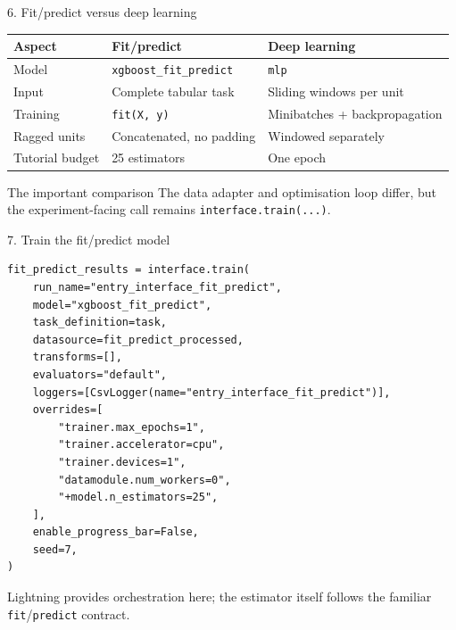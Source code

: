 \documentclass[aspectratio=169,10pt]{beamer}
\begin{document}
\begin{frame}{6. Fit/predict versus deep learning}
  \centering
  \setlength{\tabcolsep}{6pt}
  \renewcommand{\arraystretch}{1.32}
  \begin{tabular}{p{}p{}p{}}
    \toprule
    \textbf{Aspect} & \textcolor{fitblue}{\textbf{Fit/predict}} &
    \textcolor{deepgreen}{\textbf{Deep learning}} \\
    \midrule
    Model & \texttt{xgboost\_fit\_predict} & \texttt{mlp} \\
    Input & Complete tabular task & Sliding windows per unit \\
    Training & \texttt{fit(X, y)} & Minibatches + backpropagation \\
    Ragged units & Concatenated, no padding & Windowed separately \\
    Tutorial budget & 25 estimators & One epoch \\
    \bottomrule
  \end{tabular}

  \vspace{1em}
  \begin{block}{The important comparison}
    The data adapter and optimisation loop differ, but the experiment-facing
    call remains \texttt{interface.train(...)}.
  \end{block}
\end{frame}

\begin{frame}[fragile]{7. Train the fit/predict model}
\begin{lstlisting}[style=python]
fit_predict_results = interface.train(
    run_name="entry_interface_fit_predict",
    model="xgboost_fit_predict",
    task_definition=task,
    datasource=fit_predict_processed,
    transforms=[],
    evaluators="default",
    loggers=[CsvLogger(name="entry_interface_fit_predict")],
    overrides=[
        "trainer.max_epochs=1",
        "trainer.accelerator=cpu",
        "trainer.devices=1",
        "datamodule.num_workers=0",
        "+model.n_estimators=25",
    ],
    enable_progress_bar=False,
    seed=7,
)
\end{lstlisting}

  \small Lightning provides orchestration here; the estimator itself follows
  the familiar \texttt{fit}/\texttt{predict} contract.
\end{frame}
\end{document}
